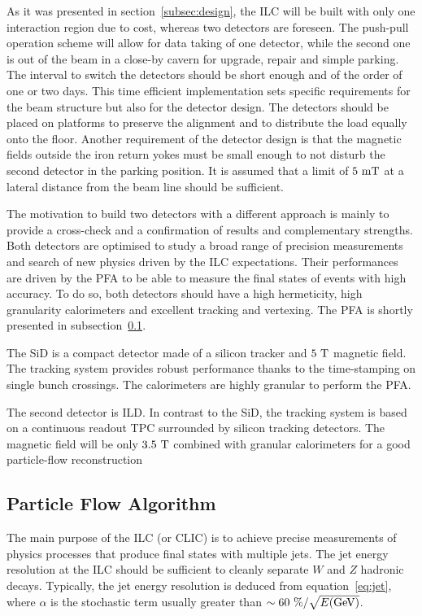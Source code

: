   As it was presented in section~\ref{subsec:design}, the \gls{ILC} will be built with only one interaction region due to cost, whereas two detectors are foreseen.
  The push-pull operation scheme will allow for data taking of one detector, while the second one is out of the beam in a close-by cavern for upgrade, repair and simple parking.
  The interval to switch the detectors should be short enough and of the order of one or two days.
  This time efficient implementation sets specific requirements for the beam structure but also for the detector design.
  The detectors should be placed on platforms to preserve the alignment and to distribute the load equally onto the floor.
  Another requirement of the detector design is that the magnetic fields outside the iron return yokes must be small enough to not disturb the second detector in the parking position.
  It is assumed that a limit of $5~\rm{mT}$ at a lateral distance from the beam line should be sufficient.

  The motivation to build two detectors with a different approach is mainly to provide a cross-check and a confirmation of results and complementary strengths.
  Both detectors are optimised to study a broad range of precision measurements and search of new physics driven by the \gls{ILC} expectations.
  Their performances are driven by the \gls{PFA} to be able to measure the final states of events with high accuracy.
  To do so, both detectors should have a high hermeticity, high granularity calorimeters and excellent tracking and vertexing.
  The \gls{PFA} is shortly presented in subsection~\ref{subsec:PFA}.

  The \gls{SiD} is a compact detector made of a silicon tracker and $5~\rm{T}$ magnetic field.
  The tracking system provides robust performance thanks to the time-stamping on single bunch crossings.
  The calorimeters are highly granular to perform the \gls{PFA}.

  The second detector is \acrfull{ILD}.
  In contrast to the \gls{SiD}, the tracking system is based on a continuous readout \gls{TPC} surrounded by silicon tracking detectors.
  The magnetic field will be only $3.5~\rm{T}$ combined with granular calorimeters for a good particle-flow reconstruction

    \subsection{Particle Flow Algorithm}
    \label{subsec:PFA}

    The main purpose of the \gls{ILC} (or \gls{CLIC}) is to achieve precise measurements of physics processes that produce final states with multiple jets.
    The jet energy resolution at the \gls{ILC} should be sufficient to cleanly separate $W$ and $Z$ hadronic decays.
    Typically, the jet energy resolution is deduced from equation~\ref{eq:jet}, where $\alpha$ is the stochastic term usually greater than $\sim 60~\% / \sqrt{E\rm{(GeV)}}$.


